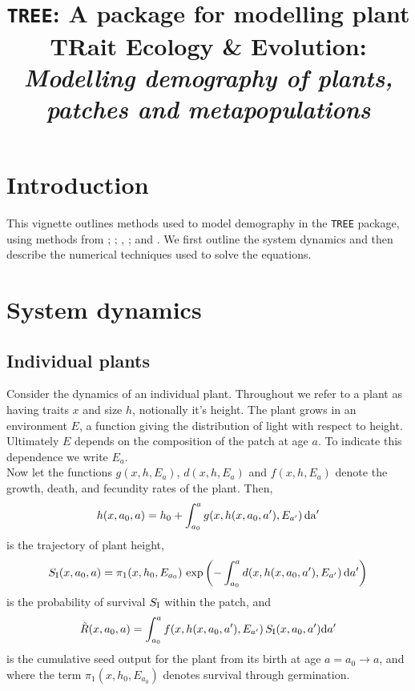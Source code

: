 \documentclass[10pt,twoside]{article}
\title{\texttt{TREE}: A package for modelling plant TRait Ecology \& Evolution:
\emph{Modelling demography of plants, patches and metapopulations}}
\date{}
\begin{document}
\maketitle


\section{Introduction}\label{introduction}
This vignette outlines methods used to model demography in the \texttt{TREE}
package, using methods from \citet{Deroos-1997}; \citet{Kohyama-1993};
\citet{Moorcroft-2001}, \citet{Falster-2011}; and \citet{Falster-2015}.
We first outline the system dynamics and then describe the numerical
techniques used to solve the equations.

\section{System dynamics}\label{system-dynamics}

\subsection{Individual plants}\label{individual-plants}

Consider the dynamics of an individual plant. Throughout we refer to a
plant as having traits \(x\) and size \(h\), notionally it's height. The
plant grows in an environment \(E\), a function giving the distribution
of light with respect to height. Ultimately \(E\) depends on the
composition of the patch at age \(a\). To indicate this dependence we
write \(E_a\).\\Now let the functions \(g(x,h,E_a)\), \(d(x,h,E_a)\) and
\(f(x,h,E_a)\) denote the growth, death, and fecundity rates of the
plant. Then,
\begin{equation} \label{eq:size}
  h(x, a_0, a) = h_0 + \int_{a_0}^{a} g(x, h(x, a_0, a^\prime),E_{a^\prime}) \, \rm{d}a^\prime
\end{equation}
is the trajectory of plant height,
\begin{equation} \label{eq:survivalIndividual}
  S_{\rm I} (x, a_0, a) = \pi_1 (x,h_0, E_{a_0}) \, \exp\left(- \int_{a_0}^{a} d(x,h(x, a_0, a^\prime), E_{a^\prime}) \, {\rm d} a^\prime \right)
\end{equation}
is the probability of survival \(S_{\rm I}\) within the patch, and
\begin{equation} \label{eq:tildeR1}
  \tilde{R}(x, a_0, a) =\int_{a_0}^{a} f(x, h(x, a_0, a^\prime), E_{a^\prime}) \, S_{\rm I} (x, a_0, a^\prime) {\rm d} a^\prime
\end{equation}
is the cumulative seed output for the plant from its birth at age
\(a=a_0 \rightarrow a\), and where the term \(\pi_1 (x,h_0, E_{a_0})\)
denotes survival through germination.
\end{document}
